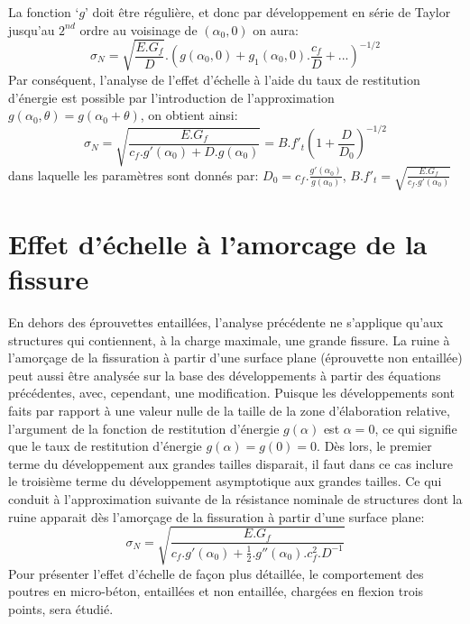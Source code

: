 \documentclass{DGC_M2_report}
\begin{document}
\\\\
La fonction ‘$g$' doit être régulière, et donc par développement en série de Taylor jusqu'au $2^{nd}$ ordre au voisinage de $(\alpha_0, 0)$ on aura:
\[\sigma_N = \sqrt{\frac{E.G_f}{D}}.(g(\alpha_0, 0)+g_1(\alpha_0, 0).\frac{c_f}{D}+...)^{-1/2}\]
Par conséquent, l'analyse de l'effet d'échelle à l'aide du taux de restitution d'énergie est possible par l'introduction de l'approximation $g(\alpha_0, \theta) = g(\alpha_0 + \theta)$, on obtient ainsi:
\begin{equation}
\sigma_N = \sqrt{\frac{E.G_f}{c_f.g'(\alpha_0)+D.g(\alpha_0)}} = B.f'_{t}(1+\frac{D}{D_0})^{-1/2}
\end{equation}
dans laquelle les paramètres sont donnés par: $D_0 = c_f.\frac{g'(\alpha_0)}{g(\alpha_0)}$, $B.f'_{t}=\sqrt{\frac{E.G_f}{c_f.g'(\alpha_0)}}$



\section{Effet d'échelle à l'amorcage de la fissure}
En dehors des éprouvettes entaillées,
l'analyse précédente ne s'applique qu'aux structures qui contiennent, à la charge maximale, une
grande fissure. La ruine à l'amorçage de la fissuration à partir d'une surface plane (éprouvette
non entaillée) peut aussi être analysée sur la base des développements à partir des équations
précédentes, avec, cependant, une modification. Puisque les développements sont faits par
rapport à une valeur nulle de la taille de la zone d'élaboration relative, l'argument de la fonction
de restitution d'énergie $g(\alpha)$ est $\alpha=0$, ce qui signifie que le taux de restitution d'énergie
$g(\alpha)=g(0)=0$. Dès lors, le premier terme du développement aux grandes tailles disparait, il faut
dans ce cas inclure le troisième terme du développement asymptotique aux grandes tailles. Ce
qui conduit à l'approximation suivante de la résistance nominale de structures dont la ruine
apparait dès l'amorçage de la fissuration à partir d'une surface plane:
\begin{equation}
\sigma_N = \sqrt{\frac{E.G_f}{c_f.g'(\alpha_0)+\frac{1}{2}.g''(\alpha_0).c_{f}^{2} .D^{-1}}}
\end{equation}
Pour présenter l'effet d'échelle de façon plus détaillée, le comportement des poutres en
micro-béton, entaillées et non entaillée, chargées en flexion trois points, sera étudié.
\end{document}
